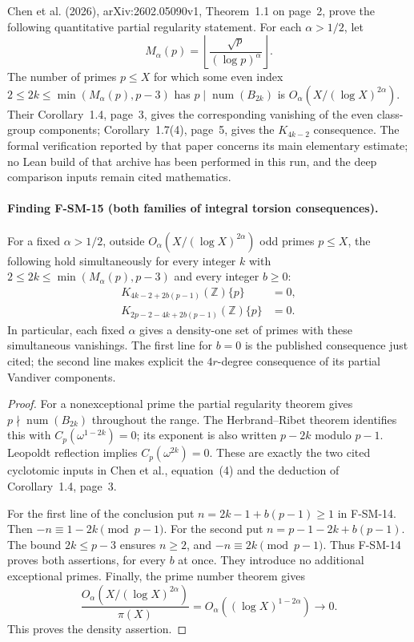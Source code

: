 \documentclass[11pt,a4paper]{article}
\theoremstyle{definition}\newtheorem{definition}[theorem]{Definition}
\theoremstyle{remark}\newtheorem{remark}[theorem]{Remark}
\begin{document}
Chen et al. (2026), arXiv:2602.05090v1, Theorem~1.1 on page~2, prove
the following quantitative partial regularity statement.  For each
$\alpha>1/2$, let
\[
 M_\alpha(p)=\left\lfloor\frac{\sqrt p}{(\log p)^\alpha}\right\rfloor.
\]
The number of primes $p\leq X$ for which some even index
$2\leq2k\leq\min(M_\alpha(p),p-3)$ has
$p\mid\operatorname{num}(B_{2k})$ is
$O_\alpha(X/(\log X)^{2\alpha})$.  Their Corollary~1.4, page~3,
gives the corresponding vanishing of the even class-group components;
Corollary~1.7(4), page~5, gives the $K_{4k-2}$ consequence.
The formal verification reported by that paper concerns its main
elementary estimate; no Lean build of that archive has been performed
in this run, and the deep comparison inputs remain cited mathematics.

\paragraph{Finding F-SM-15 (both families of integral torsion consequences).}
For a fixed $\alpha>1/2$, outside
$O_\alpha(X/(\log X)^{2\alpha})$ odd primes $p\leq X$, the following
hold simultaneously for every integer $k$ with
$2\leq2k\leq\min(M_\alpha(p),p-3)$ and every integer $b\geq0$:
\begin{align*}
 K_{4k-2+2b(p-1)}(\mathbb Z)\{p\}&=0,\\
 K_{2p-2-4k+2b(p-1)}(\mathbb Z)\{p\}&=0.
\end{align*}
In particular, each fixed $\alpha$ gives a density-one set of primes
with these simultaneous vanishings.  The first line for $b=0$ is the
published consequence just cited; the second line makes explicit the
$4r$-degree consequence of its partial Vandiver components.

\begin{proof}
For a nonexceptional prime the partial regularity theorem gives
$p\nmid\operatorname{num}(B_{2k})$ throughout the range.  The
Herbrand--Ribet theorem identifies this with
$C_p(\omega^{1-2k})=0$; its exponent is also written $p-2k$ modulo
$p-1$.  Leopoldt reflection implies
$C_p(\omega^{2k})=0$.  These are exactly the two cited cyclotomic
inputs in Chen et al., equation~(4) and the deduction of
Corollary~1.4, page~3.

For the first line of the conclusion put
$n=2k-1+b(p-1)\geq1$ in F-SM-14.  Then
$-n\equiv1-2k\pmod{p-1}$.  For the second put
$n=p-1-2k+b(p-1)$.  The bound $2k\leq p-3$ ensures $n\geq2$, and
$-n\equiv2k\pmod{p-1}$.  Thus F-SM-14 proves both assertions, for
every $b$ at once.  They introduce no additional exceptional primes.
Finally, the prime number theorem gives
\[
 \frac{O_\alpha(X/(\log X)^{2\alpha})}{\pi(X)}
       =O_\alpha((\log X)^{1-2\alpha})\longrightarrow0.
\]
This proves the density assertion.
\end{proof}
\end{document}
